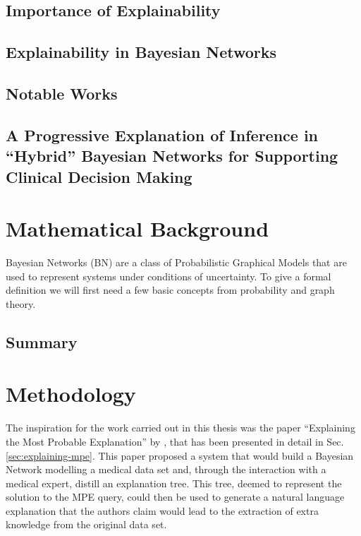 \documentclass[mscthesis]{usiinfthesis}
\begin{document}
\section{Importance of Explainability}

\section{Explainability in Bayesian Networks}

\section{Notable Works}



\section{A Progressive Explanation of Inference in \enquote{Hybrid} Bayesian Networks for Supporting Clinical Decision Making}

\chapter{Mathematical Background}\label{chap:mathematical-background}
Bayesian Networks (BN) are a class of Probabilistic Graphical Models that are used to represent systems under conditions of uncertainty.
To give a formal definition we will first need a few basic concepts from probability and graph theory.




\section{Summary}


\chapter{Methodology}\label{chap:methodology}
 The inspiration for the work carried out in this thesis was the paper \enquote{Explaining the Most Probable Explanation} by \cite{Butz2018}, that has been presented in detail in Sec. \ref{sec:explaining-mpe}.
 This paper proposed a system that would build a Bayesian Network modelling a medical data set and, through the interaction with a medical expert, distill an explanation tree.
 This tree, deemed to represent the solution to the MPE query, could then be used to generate a natural language explanation that the authors claim would lead to the extraction of extra knowledge from the original data set.  
\end{document}
